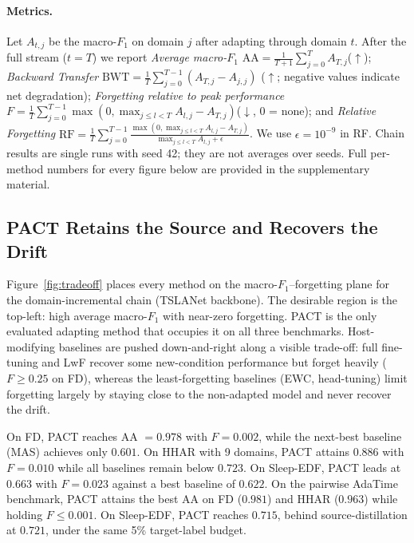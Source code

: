 \documentclass[letterpaper]{article} %
\begin{document}
\paragraph{Metrics.}
Let $A_{t,j}$ be the macro-$F_1$ on domain $j$ after adapting through domain $t$. After the full stream ($t=T$) we report
\emph{Average macro-$F_1$}
$\mathrm{AA}=\frac{1}{T+1}\sum_{j=0}^{T}A_{T,j}$\;($\uparrow$);
\emph{Backward Transfer}
$\mathrm{BWT}=\frac{1}{T}\sum_{j=0}^{T-1}(A_{T,j}-A_{j,j})$
($\uparrow$; negative values indicate net degradation);
\emph{Forgetting relative to peak performance}
$F=\frac{1}{T}\sum_{j=0}^{T-1}
\max(0,\max_{j\le l<T}A_{l,j}-A_{T,j})$\;($\downarrow$, 0 = none);
and \emph{Relative Forgetting}
$\mathrm{RF}=\frac{1}{T}\sum_{j=0}^{T-1}
\frac{\max(0,\max_{j\le l<T}A_{l,j}-A_{T,j})}
{\max_{j\le l<T}A_{l,j}+\epsilon}$.
We use $\epsilon=10^{-9}$ in RF.
Chain results are single runs with seed 42; they are not averages over seeds.
Full per-method numbers for every figure below are provided in the
supplementary material.

\subsection{PACT Retains the Source and Recovers the Drift}
\label{sec:main-results}
Figure~\ref{fig:tradeoff} places every method on the macro-$F_1$--forgetting
plane for the domain-incremental chain (TSLANet backbone). The desirable
region is the top-left: high average macro-$F_1$ with near-zero forgetting.
PACT is the only evaluated adapting method that occupies it on all three benchmarks.
Host-modifying baselines are pushed down-and-right along a visible
trade-off: full fine-tuning and LwF recover some new-condition performance but forget
heavily ($F\!\ge\!0.25$ on FD), whereas the least-forgetting baselines
(EWC, head-tuning) limit forgetting largely by staying close to the
non-adapted model and never recover the drift.

On FD, PACT reaches AA $= 0.978$ with $F = 0.002$, while the
next-best baseline (MAS) achieves only $0.601$. On HHAR with 9 domains,
PACT attains $0.886$ with $F=0.010$ while all baselines remain below $0.723$.
On Sleep-EDF, PACT leads at $0.663$ with $F=0.023$ against a best baseline of
$0.622$.
On the pairwise AdaTime benchmark, PACT attains the best AA on FD ($0.981$)
and HHAR ($0.963$) while holding $F\!\le\!0.001$. On Sleep-EDF, PACT reaches
$0.715$, behind source-distillation at $0.721$, under the same 5\%
target-label budget.
\end{document}
